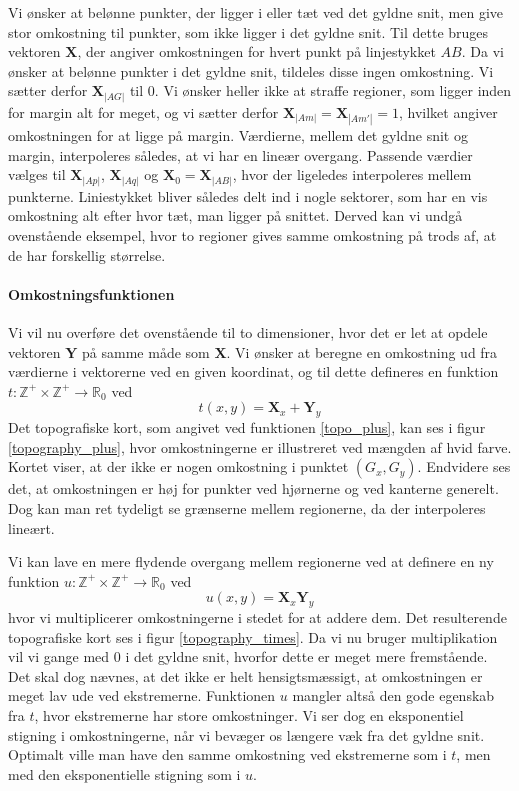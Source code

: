 {Vi ønsker at belønne punkter, der ligger i eller tæt ved det gyldne
snit, men give stor omkostning til punkter, som ikke ligger i det gyldne
snit.  Til dette bruges vektoren $\mathbf{X}$, der angiver omkostningen
for hvert punkt på linjestykket $AB$. Da vi ønsker at belønne punkter i
det gyldne snit, tildeles disse ingen omkostning. Vi sætter derfor
$\mathbf{X}_{|AG|}$ til $0$. Vi ønsker heller ikke at straffe regioner,
som ligger inden for margin alt for meget, og vi sætter derfor
$\mathbf{X}_{|Am|} = \mathbf{X}_{|Am'|} = 1$, hvilket angiver
omkostningen for at ligge på margin. Værdierne, mellem det gyldne snit
og margin, interpoleres således, at vi har en lineær overgang. Passende
værdier vælges til $\mathbf{X}_{|Ap|}$, $\mathbf{X}_{|Aq|}$ og
$\mathbf{X}_{0} = \mathbf{X}_{|AB|}$, hvor der ligeledes interpoleres
mellem punkterne.  Liniestykket bliver således delt ind i nogle
sektorer, som har en vis omkostning alt efter hvor tæt, man ligger på
snittet. Derved kan vi undgå ovenstående eksempel, hvor to regioner
gives samme omkostning på trods af, at de har forskellig størrelse.

\paragraph{Omkostningsfunktionen}
Vi vil nu overføre det ovenstående til to dimensioner, hvor det er let
at opdele vektoren $\mathbf{Y}$ på samme måde som $\mathbf{X}$. Vi
ønsker at beregne en omkostning ud fra værdierne i vektorerne ved en
given koordinat, og til dette defineres en funktion $t : \mathbb{Z}^{+}
\times \mathbb{Z}^{+} \rightarrow \mathbb{R}_{0}$ ved
\begin{equation}
    t(x, y) = \mathbf{X}_x + \mathbf{Y}_y
    \label{topo_plus}
\end{equation}
Det topografiske kort, som angivet ved funktionen \ref{topo_plus}, kan
ses i figur \ref{topography_plus}, hvor omkostningerne er illustreret
ved mængden af hvid farve. Kortet viser, at der ikke er nogen omkostning
i punktet $(G_{x}, G_{y})$. Endvidere ses det, at omkostningen er høj
for punkter ved hjørnerne og ved kanterne generelt. Dog kan man ret
tydeligt se grænserne mellem regionerne, da der interpoleres lineært.

Vi kan lave en mere flydende overgang mellem regionerne ved at definere
en ny funktion $u : \mathbb{Z}^{+} \times \mathbb{Z}^{+} \rightarrow
\mathbb{R}_{0}$ ved
\begin{equation}
    u(x, y) = \mathbf{X}_x\mathbf{Y}_y
    \label{topo_multiply}
\end{equation}
hvor vi multiplicerer omkostningerne i stedet for at addere dem. Det
resulterende topografiske kort ses i figur \ref{topography_times}. Da vi
nu bruger multiplikation vil vi gange med $0$ i det gyldne snit, hvorfor
dette er meget mere fremstående. Det skal dog nævnes, at det ikke er
helt hensigtsmæssigt, at omkostningen er meget lav ude ved ekstremerne.
Funktionen $u$ mangler altså den gode egenskab fra $t$, hvor ekstremerne
har store omkostninger.  Vi ser dog en eksponentiel stigning i
omkostningerne, når vi bevæger os længere væk fra det gyldne snit.
Optimalt ville man have den samme omkostning ved ekstremerne som i $t$,
men med den eksponentielle stigning som i $u$.

}
